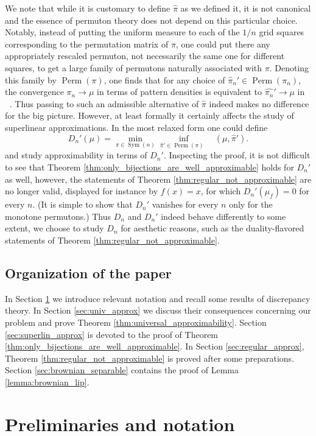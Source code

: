 \documentclass{article}
\newcommand{\Perm}{\mathop{\mathrm{Perm}}}
\newcommand{\Sym}{\mathop{\mathrm{Sym}}}
\newcommand{\ds}{\mathop{d_\square}}
\theoremstyle{definition}
\begin{document}
We note that while it is customary to define $\widehat{\pi}$ as we defined it, it is not canonical and the essence of permuton theory does not depend on this particular choice. Notably, instead of putting the uniform measure to each of the $1/n$ grid squares corresponding to the permutation matrix of $\pi$, one could put there any appropriately rescaled permuton, not necessarily the same one for different squares, to get a large family of permutons naturally associated with $\pi$. Denoting this family by $\Perm(\pi)$, one finds that for any choice of $\widehat{\pi}_n'\in \Perm(\pi_n)$, the convergence $\pi_n\to \mu$ in terms of pattern densities is equivalent to $\widehat{\pi_n}'\to \mu$ in $\ds$. Thus passing to such an admissible alternative of $\widehat{\pi}$ indeed makes no difference for the big picture. However, at least formally it certainly affects the study of superlinear approximations. In the most relaxed form one could define 
$$D_n'(\mu)=\min_{\pi \in \Sym(n)} \inf_{\widehat{\pi}'\in \Perm(\pi)\text{ }} \ds(\mu, \widehat{\pi}').$$
and study approximability in terms of $D_n'$. Inspecting the proof, it is not difficult to see that Theorem \ref{thm:only_bijections_are_well_approximable} holds for $D_n'$ as well, however, the statements of Theorem \ref{thm:regular_not_approximable} are no longer valid, displayed for instance by $f(x)=x$, for which $D_n'(\mu_f)=0$ for every $n$. (It is simple to show that $D_n'$ vanishes for every $n$ only for the monotone permutons.) Thus $D_n$ and $D_n'$ indeed behave differently to some extent, we choose to study $D_n$ for aesthetic reasons, such as the duality-flavored statements of Theorem \ref{thm:regular_not_approximable}.

\subsection{Organization of the paper}
In Section \ref{sec:prelim} we introduce relevant notation and recall some results of discrepancy theory. In Section \ref{sec:univ_approx} we discuss their consequences concerning our problem and prove Theorem \ref{thm:universal_approximability}. Section \ref{sec:superlin_approx} is devoted to the proof of Theorem \ref{thm:only_bijections_are_well_approximable}. In Section \ref{sec:regular_approx}, Theorem \ref{thm:regular_not_approximable} is proved after some preparations. Section \ref{sec:brownian_separable} contains the proof of Lemma \ref{lemma:brownian_lip}.


\section{Preliminaries and notation} \label{sec:prelim}
\end{document}
